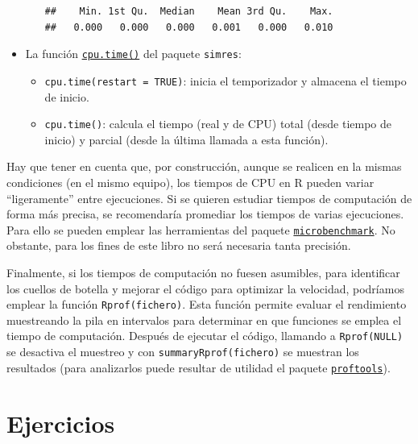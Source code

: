 \documentclass[
]{book}
\theoremstyle{break}
\theoremstyle{nonumberplain}
\begin{document}
\begin{itemize}
\begin{itemize}
\begin{verbatim}
##    Min. 1st Qu.  Median    Mean 3rd Qu.    Max. 
##   0.000   0.000   0.000   0.001   0.000   0.010
\end{verbatim}
  \end{itemize}
\item
  La función \href{https://rubenfcasal.github.io/simres/reference/cpu.time.html}{\texttt{cpu.time()}} del paquete \texttt{simres}:

  \begin{itemize}
  \item
    \texttt{cpu.time(restart\ =\ TRUE)}: inicia el temporizador y almacena el tiempo de inicio.
  \item
    \texttt{cpu.time()}: calcula el tiempo (real y de CPU) total (desde tiempo de inicio) y parcial (desde la última llamada a esta función).
  \end{itemize}
\end{itemize}

Hay que tener en cuenta que, por construcción, aunque se realicen en la mismas condiciones (en el mismo equipo), los tiempos de CPU en R pueden variar ``ligeramente'' entre ejecuciones.
Si se quieren estudiar tiempos de computación de forma más precisa, se recomendaría promediar los tiempos de varias ejecuciones.
Para ello se pueden emplear las herramientas del paquete \href{https://CRAN.R-project.org/package=microbenchmark}{\texttt{microbenchmark}}.
No obstante, para los fines de este libro no será necesaria tanta precisión.

Finalmente, si los tiempos de computación no fuesen asumibles, para identificar los cuellos de botella y mejorar el código para optimizar la velocidad, podríamos emplear la función \texttt{Rprof(fichero)}.
Esta función permite evaluar el rendimiento muestreando la pila en intervalos para determinar en que funciones se emplea el tiempo de computación.
Después de ejecutar el código, llamando a \texttt{Rprof(NULL)} se desactiva el muestreo y con \texttt{summaryRprof(fichero)} se muestran los resultados (para analizarlos puede resultar de utilidad el paquete \href{https://CRAN.R-project.org/package=proftools}{\texttt{proftools}}).

\hypertarget{ejercicios}{%
\section{Ejercicios}\label{ejercicios}}
\end{document}
